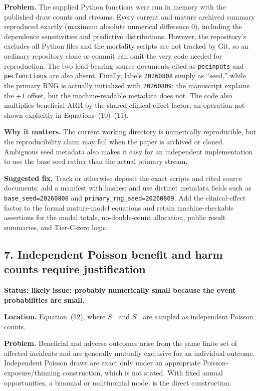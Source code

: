 \documentclass[11pt]{article}
\begin{document}
\textbf{Problem.} The supplied Python functions were run in memory with the
published draw counts and streams.  Every current and mature archived summary
reproduced exactly (maximum absolute numerical difference $0$), including the
dependence sensitivities and predictive distributions.  However, the
repository's  excludes all Python files and the mortality
scripts are not tracked by Git, so an ordinary repository clone or commit can
omit the very code needed for reproduction.  The two load-bearing source
documents cited as \texttt{pecinputs} and \texttt{pecfunctions} are also absent.
Finally,  labels \texttt{20260808} simply
as ``seed,'' while the primary RNG is actually initialized with
\texttt{20260809}; the manuscript explains the $+1$ offset, but the
machine-readable metadata does not.  The code also multiplies beneficial ARR
by the shared clinical-effect factor, an operation not shown explicitly in
Equations~(10)--(11).

\textbf{Why it matters.} The current working directory is numerically
reproducible, but the reproducibility claim may fail when the paper is archived
or cloned.  Ambiguous seed metadata also makes it easy for an independent
implementation to use the base seed rather than the actual primary stream.

\textbf{Suggested fix.} Track or otherwise deposit the exact scripts and cited
source documents; add a manifest with hashes; and use distinct metadata fields
such as \texttt{base\_seed=20260808} and
\texttt{primary\_rng\_seed=20260809}.  Add the clinical-effect factor to the
formal mature-model equations and retain machine-checkable assertions for the
modal totals, no-double-count allocation, public result summaries, and
Tier-C-zero logic.

\subsection*{7. Independent Poisson benefit and harm counts require
justification}

\textbf{Status: likely issue; probably numerically small because the event
probabilities are small.}

\textbf{Location.} Equation~(12), where $S^+$ and $S^-$ are sampled as
independent Poisson counts.

\textbf{Problem.} Beneficial and adverse outcomes arise from the same finite
set of affected incidents and are generally mutually exclusive for an
individual outcome.  Independent Poisson draws are exact only under an
appropriate Poisson-exposure/thinning construction, which is not stated.  With
fixed annual opportunities, a binomial or multinomial model is the direct
construction.
\end{document}
